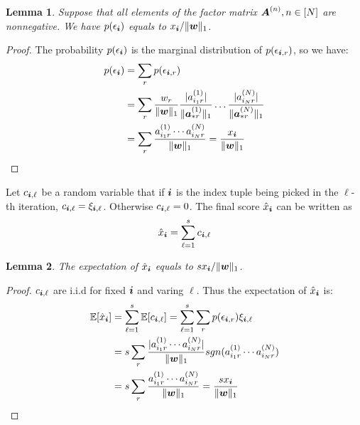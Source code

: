 \documentclass[10pt,journal,compsoc]{IEEEtran}
\newcommand{\Sca}[3]{{#1}^{(#2)}_{i_#2#3}}%
\newcommand{\anr}[2]{\Sca{a}{#1}{#2}}
\newcommand{\score}[1]{\xi_{\V{i},#1}}
\newcommand{\V}[1]{{\boldsymbol{{\MakeLowercase{#1}}}}}
\newcommand{\ColVec}[3]{\V{#1}^{(#2)}_{#3}}
\newcommand{\NormColA}[2]{\norm{\ColVec{a}{#1}{*#2}}{1}}
\newcommand{\predx}{\hat{x}_{\V{i}}}
\newcommand{\M}[1]{{\boldsymbol{{\MakeUppercase{#1}}}}}
\newcommand{\norm}[2]{\|#1\|_{#2}}
\newtheorem{lemma}{Lemma}
\begin{document}
\begin{lemma}\label{lem:Probability}
	Suppose that all elements of the factor matrix $\M{A}^{(n)}, n\in[N]$ are nonnegative. We have
	$p(\epsilon_{\V{i}})$ equals to $x_{\V{i}}/\norm{\V{w}}{1}$.
\end{lemma}
\begin{proof}
	The probability $p(\epsilon_{\V{i}})$ is the marginal distribution of $p(\epsilon_{\V{i},r})$,
	so we have:
	\begin{align*}
	p(\epsilon_{\V{i}})
	& = \sum_{r} p(\epsilon_{\V{i},r}) \\
	& = \sum_{r} \frac{w_{r}}{\norm{\V{W}}{1}}
	\frac{|\anr{1}{r}|}{\NormColA{1}{r}} \ldots \frac{|\anr{N}{r}|}{\NormColA{N}{r}}\\
	& = \sum_{r} \frac{\anr{1}{r}\cdots\anr{N}{r}}{\norm{\V{W}}{1}}
	= \frac{x_{\V{i}}}{\norm{\V{w}}{1}}
	\end{align*}
\end{proof}
Let $c_{\V{i},\ell}$ be a random variable that if $\V{i}$ is the index tuple
being picked in the $\ell$-th iteration, $c_{\V{i},\ell}=\score{\ell}$.
Otherwise $c_{\V{i},\ell}=0$.
The final score $\predx$ can be written as
\begin{equation}\label{eq:score}
\predx = \sum_{\ell=1}^{s} c_{\V{i},\ell}
\end{equation}

\begin{lemma}\label{lem:Expectation}
	The expectation of $\predx$ equals to $sx_{\V{i}}/\norm{\V{w}}{1}$.
\end{lemma}
\begin{proof}
	$c_{\V{i},\ell}$ are i.i.d for fixed $\V{i}$ and varing $\ell$.
	Thus the expectation of $\predx$ is:
	\begin{align*}
	\mathbb{E}[\predx]
	& = \sum_{\ell=1}^{s}\mathbb{E}[c_{\V{i},\ell}] = \sum_{\ell=1}^{s}\sum_{r} p(\epsilon_{\V{i},r})\score{\ell} \\
	& = s\sum_{r} \frac{|\anr{1}{r}\cdots\anr{N}{r}|}{\norm{\V{W}}{1}}
	sgn(\anr{1}{r}\cdots\anr{N}{r})\\
	& = s\sum_{r} \frac{\anr{1}{r}\cdots\anr{N}{r}}{\norm{\V{W}}{1}}
	= \frac{sx_{\V{i}}}{\norm{\V{w}}{1}}
	\end{align*}
\end{proof}
\end{document}
